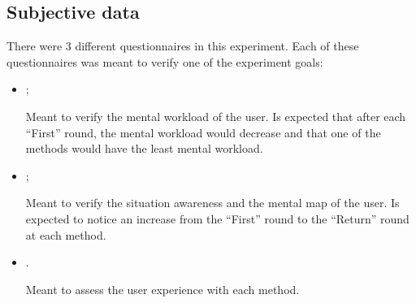 \subsection{Subjective data}

There were 3 different questionnaires in this experiment. Each of these questionnaires was meant to verify one of the experiment goals:

\begin{itemize}
    \item {};
    
        Meant to verify the mental workload of the user. Is expected that after each “First” round, the mental workload would decrease and that one of the methods would have the least mental workload.

    \item {};
    
        Meant to verify the situation awareness and the mental map of the user. Is expected to notice an increase from the “First” round to the “Return” round at each method.

    \item {}.

        Meant to assess the user experience with each method.

\end{itemize}






